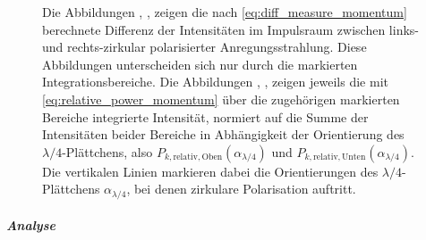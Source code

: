 \documentclass[titlepage,  ngerman]{article}
\begin{document}
\begin{figure}[h]
			\caption[Differenz- und Integrationsdaten PSHE Impulsraum]{Die Abbildungen , ,  zeigen die nach \eqref{eq:diff_measure_momentum} berechnete Differenz der Intensitäten im Impulsraum zwischen links- und rechts-zirkular polarisierter Anregungsstrahlung. Diese Abbildungen unterscheiden sich nur durch die markierten Integrationsbereiche. Die Abbildungen , ,  zeigen jeweils die mit \eqref{eq:relative_power_momentum} über die zugehörigen markierten Bereiche integrierte Intensität, normiert auf die Summe der Intensitäten beider Bereiche in Abhängigkeit der Orientierung des $\lambda/4$-Plättchens, also $P_{k, \mathrm{relativ}, \mathrm{Oben}}(\alpha_{\lambda/4})$ und $P_{k, \mathrm{relativ}, \mathrm{Unten}}(\alpha_{\lambda/4})$. Die vertikalen Linien markieren dabei die Orientierungen des $\lambda/4$-Plättchens $\alpha_{\lambda/4}$, bei denen zirkulare Polarisation auftritt.}	
			\label{fig:spin_hall_measure}	
		\end{figure}
		\subparagraph{Analyse}
\end{document}
